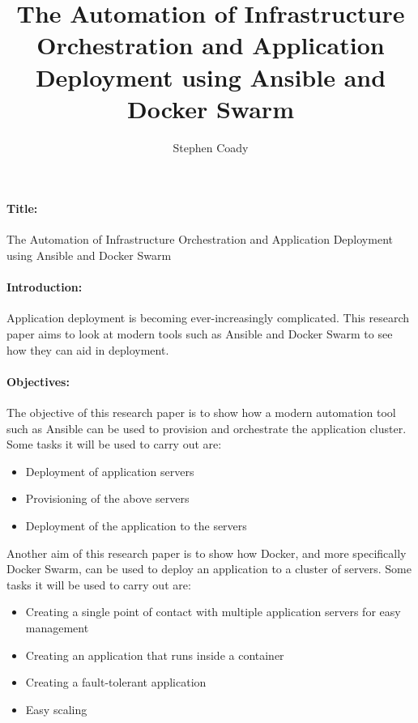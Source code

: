 \documentclass{article}
\author{Stephen Coady}
\title{The Automation of Infrastructure Orchestration and Application Deployment using Ansible and Docker Swarm}
\begin{document}
\maketitle
\thispagestyle{empty}
\newpage

\paragraph{Title:} 
\label{par:Title}
The Automation of Infrastructure Orchestration and Application Deployment using Ansible and Docker Swarm

\paragraph{Introduction:} 
\label{par:Introduction}
Application deployment is becoming ever-increasingly complicated. This research paper aims to look at modern tools such as Ansible and Docker Swarm to see how they can aid in deployment. 

\paragraph{Objectives:}
\label{par:Objectives}
The objective of this research paper is to show how a modern automation tool such as Ansible can be used to provision and orchestrate the application cluster. \newline
\newline
Some tasks it will be used to carry out are: 

\begin{itemize}
	\item Deployment of application servers
	\item Provisioning of the above servers
	\item Deployment of the application to the servers
\end{itemize}

Another aim of this research paper is to show how Docker, and more specifically Docker Swarm, can be used to deploy an application to a cluster of servers.
\newline
\newline
Some tasks it will be used to carry out are:

\begin{itemize}
	\item Creating a single point of contact with multiple application servers for easy management
	\item Creating an application that runs inside a container
	\item Creating a fault-tolerant application
	\item Easy scaling
\end{itemize}
\end{document}
